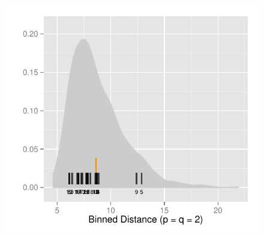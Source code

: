 \documentclass[12]{article}
\begin{document}
\begin{figure}[hbtp]
{\includegraphics[scale=0.55]{distribution-bin-dist-2-2-exp2.pdf}
\label{t2comp_2}
}
\subfigure[]{
}
\end{figure}
\end{document}
